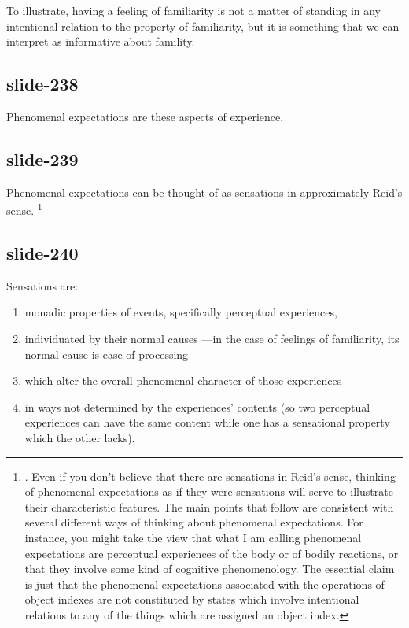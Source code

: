 \documentclass[12pt,\papersize]{extarticle}
\begin{document}
To illustrate, having a feeling of familiarity is not a matter of standing
in any
intentional relation to the property of familiarity, but it is something
that we can interpret as informative about famility.

\subsection{slide-238}
Phenomenal expectations are these aspects of experience.

\subsection{slide-239}
Phenomenal expectations can be thought of as sensations in approximately
Reid’s sense.%
\footnote{
\citet{Reid:1785cj,Reid:1785nz}.
Even if you don’t believe that there are sensations in Reid’s sense,
thinking of phenomenal expectations as if they were sensations will
serve to illustrate their characteristic features.
The main points that follow are consistent with several different ways of
thinking about phenomenal expectations.
For instance, you might take the view that
what I am calling phenomenal expectations are
perceptual experiences of the body or of bodily reactions,
or that they involve some kind of cognitive phenomenology.
The essential claim is just that the phenomenal expectations associated with
the operations of object indexes are not constituted by states which involve
intentional relations to any of the things which are assigned an object index.
}

\subsection{slide-240}
Sensations are:
\begin{enumerate}
\item monadic properties of events, specifically perceptual experiences,
\item individuated by their normal causes%
---in the case of feelings of familiarity, its normal cause is ease of processing
\item which alter the overall phenomenal character of those experiences
\item in ways not determined by the experiences’ contents
(so two perceptual experiences can have the same content while one has a sensational property which the other lacks).
\end{enumerate}
\end{document}
